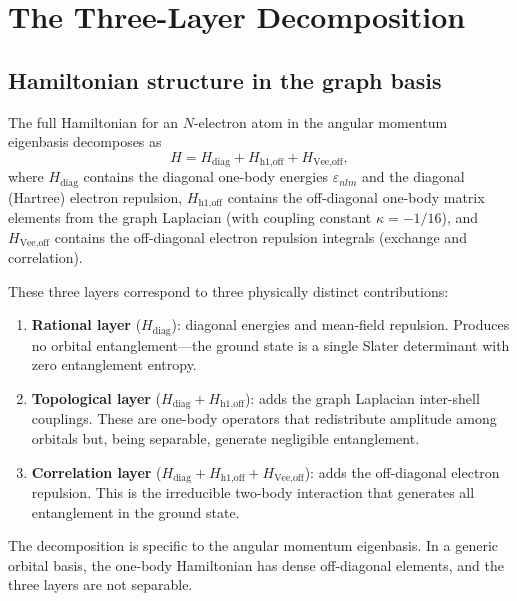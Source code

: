 \documentclass[twocolumn,pra,amsmath,amssymb,superscriptaddress]{revtex4-2}
\begin{document}
\section{The Three-Layer Decomposition}
\label{sec:threelayer}

\subsection{Hamiltonian structure in the graph basis}

The full Hamiltonian for an $N$-electron atom in the angular
momentum eigenbasis decomposes as
\begin{equation}
  H = H_{\text{diag}} + H_{\text{h1,off}} + H_{\text{Vee,off}},
  \label{eq:decomposition}
\end{equation}
where $H_{\text{diag}}$ contains the diagonal one-body energies
$\varepsilon_{nlm}$ and the diagonal (Hartree) electron repulsion,
$H_{\text{h1,off}}$ contains the off-diagonal one-body matrix
elements from the graph Laplacian (with coupling constant
$\kappa = -1/16$), and $H_{\text{Vee,off}}$ contains the
off-diagonal electron repulsion integrals (exchange and
correlation).

These three layers correspond to three physically distinct
contributions:
\begin{enumerate}
\item \textbf{Rational layer} ($H_{\text{diag}}$): diagonal
  energies and mean-field repulsion.  Produces no orbital
  entanglement---the ground state is a single Slater determinant
  with zero entanglement entropy.
\item \textbf{Topological layer} ($H_{\text{diag}} +
  H_{\text{h1,off}}$): adds the graph Laplacian inter-shell
  couplings.  These are one-body operators that redistribute
  amplitude among orbitals but, being separable, generate
  negligible entanglement.
\item \textbf{Correlation layer} ($H_{\text{diag}} +
  H_{\text{h1,off}} + H_{\text{Vee,off}}$): adds the off-diagonal
  electron repulsion.  This is the irreducible two-body interaction
  that generates all entanglement in the ground state.
\end{enumerate}

The decomposition is specific to the angular momentum eigenbasis.
In a generic orbital basis, the one-body Hamiltonian has dense
off-diagonal elements, and the three layers are not separable.
\end{document}
